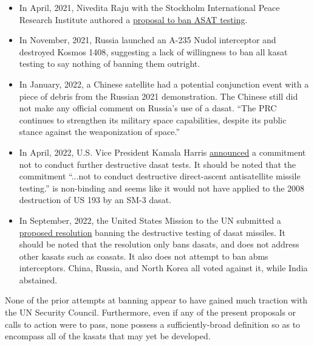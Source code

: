 \begin{itemize}

\item In April, 2021, Nivedita Raju with the Stockholm International
  Peace Research Institute authored a
  \href{https://www.sipri.org/sites/default/files/2021-04/eunpdc_no_74.pdf}{
    proposal to ban ASAT testing}.\cite{eu-ban}

\item In November, 2021, Russia launched an A-235 Nudol interceptor
  and destroyed Kosmos 1408\cite{brian}, suggesting a lack of
  willingness to ban all \ac{kasat} testing to say nothing of banning
  them outright.

\item In January, 2022, a Chinese satellite had a potential
  conjunction event with a piece of debris from the Russian 2021
  demonstration.\cite{mums-the-china} The Chinese still did not make
  any official comment on Russia's use of a
  \ac{dasat}.\cite{mums-the-china} ``The PRC continues to strengthen
  its military space capabilities, despite its public stance against
  the weaponization of space.''\cite[p66]{osd-china-21}

\item In April, 2022, U.S. Vice President Kamala Harris
  \href{https://www.youtube.com/watch?v=ZANjCHvSEpM}{announced} a
  commitment not to conduct further destructive \ac{dasat}
  tests.\cite{kamala-pinky-swears} It should be noted that the
  commitment ``...not to conduct destructive direct-ascent
  antisatellite missile testing.'' is non-binding and seems like it
  would not have applied to the 2008 destruction of US 193 by an SM-3
  \ac{dasat}.

\item In September, 2022, the United States Mission to the UN
  submitted a
  \href{https://uploads.mwp.mprod.getusinfo.com/uploads/sites/25/2022/09/US-ASAT-Documents-1-1.pdf}{proposed
    resolution} banning the destructive testing of \ac{dasat}
  missiles.\cite{un-asat-me-not} It should be noted that the
  resolution only bans \aclp{dasat}, and does not address other
  \aclp{kasat} such as \aclp{coasat}.\cite{un-asat-me-not} It also
  does not attempt to ban \acp{abm} interceptors.\cite{un-asat-me-not}
  China, Russia, and North Korea all voted against it, while India
  abstained.\cite{not-so-chinese}

\end{itemize}


None of the prior attempts at banning appear to have gained much
traction with the UN Security Council.  Furthermore, even if any of
the present proposals or calls to action were to pass, none possess a
sufficiently-broad definition so as to encompass all of the
\acp{kasat} that may yet be developed.

